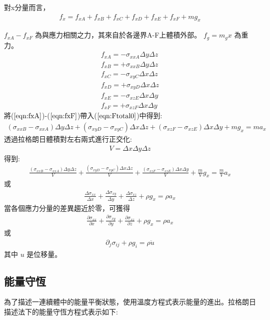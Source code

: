 對x分量而言，
\begin{align}
f_x=f_{xA}+f_{xB}+f_{xC}+f_{xD}+f_{xE}+f_{xF}+mg_x \label{eqn:Ftotal0}
\end{align}

$f_{xA}- f_{xF}$ 為與應力相關之力，其來自於各邊界A-F上體積外部。 
$f_g=m_gx$ 為重力。
\begin{align}
f_{xA} = -\sigma_{xxA}\Delta y\Delta z\label{eqn:fxA}\\
f_{xB} = +\sigma_{xxB}\Delta y\Delta z\label{eqn:fxB}\\
f_{xC} = -\sigma_{xyC}\Delta x\Delta z\label{eqn:fxC}\\
f_{xD} = +\sigma_{xyD}\Delta x\Delta z\label{eqn:fxD}\\
f_{xE} = -\sigma_{xzE}\Delta x\Delta y\label{eqn:fxE}\\
f_{xF} = +\sigma_{xzF}\Delta x\Delta y\label{eqn:fxF}
\end{align}
將($\ref{eqn:fxA}$)-($\ref{eqn:fxF}$)帶入($\ref{eqn:Ftotal0}$)中得到:
\begin{align}
(\sigma_{xxB}-\sigma_{xxA})\Delta y\Delta z+(\sigma_{xyD}-\sigma_{xyC})\Delta x\Delta z+(\sigma_{xzF}-\sigma_{xzE})\Delta x\Delta y+mg_x = ma_x 
\end{align}
透過拉格朗日體積對左右兩式進行正交化:
\begin{align}
V=\Delta x\Delta y\Delta z
\end{align}
得到:
\begin{align}
\frac{(\sigma_{xxB}-\sigma_{xxA})\Delta y\Delta z}{V}+\frac{(\sigma_{xyD}-\sigma_{xyC})\Delta x\Delta z}{V}+\frac{(\sigma_{xzF}-\sigma_{xzE})\Delta x\Delta y}{V}+\frac{m}{V}g_x=\frac{m}{V}a_x
\end{align}
或
\begin{align}
\frac{\Delta\sigma_{xx}}{\Delta x}+\frac{\Delta\sigma_{xy}}{\Delta y}+\frac{\Delta\sigma_{xz}}{\Delta z}+\rho g_x = \rho a_x
\end{align}
當各個應力分量的差異趨近於零，可獲得
\begin{align}
\frac{\partial\sigma_{xx}}{\partial x}+\frac{\partial\sigma_{xy}}{\partial y}+\frac{\partial\sigma_{xz}}{\partial z}+\rho g_x = \rho a_x
\end{align}
或
\begin{align}
\partial_j\sigma_{ij}+\rho g_i = \rho \ddot u
\end{align}
其中 $u$ 是位移量。
\subsection{能量守恆}
為了描述一連續體中的能量平衡狀態，使用溫度方程式表示能量的進出。拉格朗日描述法下的能量守恆方程式表示如下:

